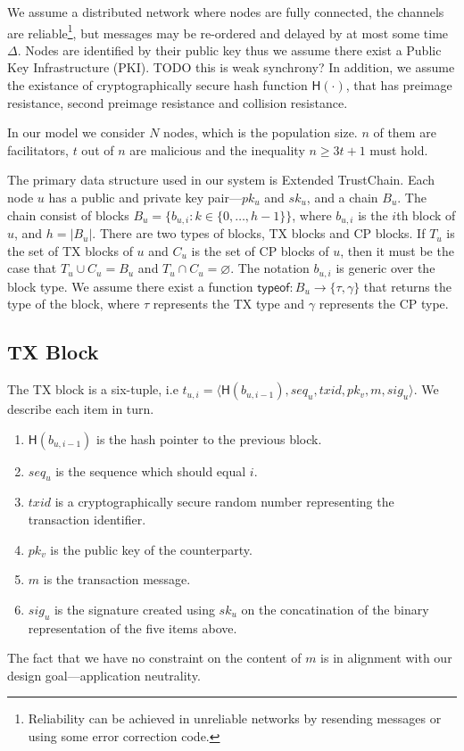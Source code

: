 We assume a distributed network where nodes are fully connected,
the channels are reliable\footnote{
    Reliability can be achieved in unreliable networks by resending messages or using some error correction code.
},
but messages may be re-ordered and delayed by at most some time $\Delta$.
Nodes are identified by their public key thus we assume there exist a Public Key Infrastructure (PKI).
TODO this is weak synchrony?
In addition, we assume the existance of cryptographically secure hash function $\textsf{H}(\cdot)$,
that has preimage resistance, second preimage resistance and collision resistance.

In our model we consider $N$ nodes, which is the population size.
$n$ of them are facilitators, $t$ out of $n$ are malicious and the inequality
$n \ge 3t + 1$ must hold.

The primary data structure used in our system is Extended TrustChain.
Each node $u$ has a public and private key pair---$pk_u$ and $sk_u$, and a chain $B_u$.
The chain consist of blocks $B_u = \{ b_{u, i} : k \in \{ 0, \dots, h - 1 \} \}$,
where $b_{u, i}$ is the $i$th block of $u$,
and $h = |B_u|$.
There are two types of blocks, TX blocks and CP blocks.
If $T_u$ is the set of TX blocks of $u$ and $C_u$ is the set of CP blocks of $u$,
then it must be the case that $T_u \cup C_u = B_u$ and $T_u \cap C_u = \varnothing$.
The notation $b_{u, i}$ is generic over the block type.
We assume there exist a function $\textsf{typeof}: B_u \rightarrow \{ \tau, \gamma \}$ that returns the type of the block,
where $\tau$ represents the TX type and $\gamma$ represents the CP type.

\subsection{TX Block}
The TX block is a six-tuple, i.e $t_{u, i} = \langle \textsf{H}(b_{u, i - 1}), seq_u, txid, pk_v, m, sig_u \rangle$.
We describe each item in turn.
\begin{enumerate}
\item $\textsf{H}(b_{u, i - 1})$ is the hash pointer to the previous block.
\item $seq_u$ is the sequence which should equal $i$.
\item $txid$ is a cryptographically secure random number representing the transaction identifier.
\item $pk_v$ is the public key of the counterparty.
\item $m$ is the transaction message.
\item $sig_u$ is the signature created using $sk_u$ on the concatination of the binary representation of the five items above.
\end{enumerate}
The fact that we have no constraint on the content of $m$ is in alignment with our design goal---application neutrality.

